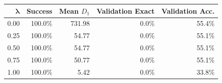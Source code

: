 \begin{tabular}{rrrrr}
\toprule
$\boldsymbol{\lambda}$ & \textbf{Success} & \textbf{Mean $D_1$} & \textbf{Validation Exact} & \textbf{Validation Acc.} \\
\midrule
0.00 & 100.0\% & 731.98 & 0.0\% & 55.4\% \\
0.25 & 100.0\% & 54.77 & 0.0\% & 55.1\% \\
0.50 & 100.0\% & 54.77 & 0.0\% & 55.1\% \\
0.75 & 100.0\% & 50.77 & 0.0\% & 55.1\% \\
1.00 & 100.0\% & 5.42 & 0.0\% & 33.8\% \\
\bottomrule
\end{tabular}
